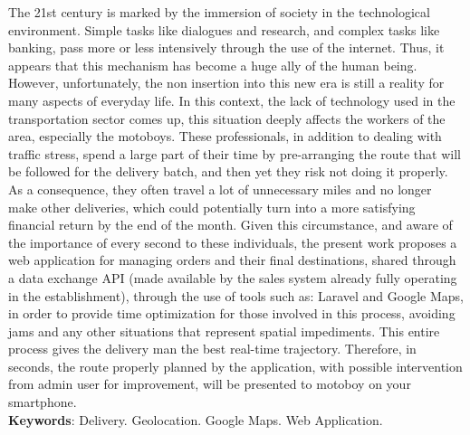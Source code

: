 
\begin{resumo}[ABSTRACT]
\begin{SingleSpacing}


The 21st century is marked by the immersion of society in the technological environment. Simple tasks like dialogues and research, and complex tasks like banking, pass more or less intensively through the use of the internet. Thus, it appears that this mechanism has become a huge ally of the human being. However, unfortunately, the non insertion into this new era is still a reality for many aspects of everyday life. In this context, the lack of technology used in the transportation sector comes up, this situation deeply affects the workers of the area, especially the motoboys. These professionals, in addition to dealing with traffic stress, spend a large part of their time by pre-arranging the route that will be followed for the delivery batch, and then yet they risk not doing it properly. As a consequence, they often travel a lot of unnecessary miles and no longer make other deliveries, which could potentially turn into a more satisfying financial return by the end of the month. Given this circumstance, and aware of the importance of every second to these individuals, the present work proposes a web application for managing orders and their final destinations, shared through a data exchange API (made available by the sales system already fully operating in the establishment), through the use of tools such as: Laravel and Google Maps, in order to provide time optimization for those involved in this process, avoiding jams and any other situations that represent spatial impediments. This entire process gives the delivery man the best real-time trajectory. Therefore, in seconds, the route properly planned by the application, with possible intervention from admin user for improvement, will be presented to motoboy on your smartphone. \\

\textbf{Keywords}: Delivery. Geolocation. Google Maps. Web Application.

\end{SingleSpacing}
\end{resumo}
